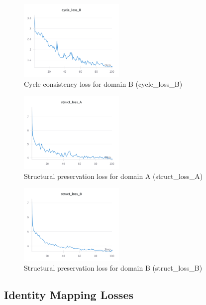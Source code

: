 \documentclass[twocolumn,superscriptaddress,aps]{revtex4-1}
\begin{document}
\begin{figure}[H]
\centering
\includegraphics[width=0.45\textwidth]{assets/cycle_loss_B.png}
\caption{Cycle consistency loss for domain B (cycle\_loss\_B)}
\label{fig:cycle_loss_B}
\end{figure}

\begin{figure}[H]
\centering
\includegraphics[width=0.45\textwidth]{assets/struct_loss_A.png}
\caption{Structural preservation loss for domain A (struct\_loss\_A)}
\label{fig:struct_loss_A}
\end{figure}

\begin{figure}[H]
\centering
\includegraphics[width=0.45\textwidth]{assets/struct_loss_B.png}
\caption{Structural preservation loss for domain B (struct\_loss\_B)}
\label{fig:struct_loss_B}
\end{figure}

\subsection{Identity Mapping Losses}
\end{document}
